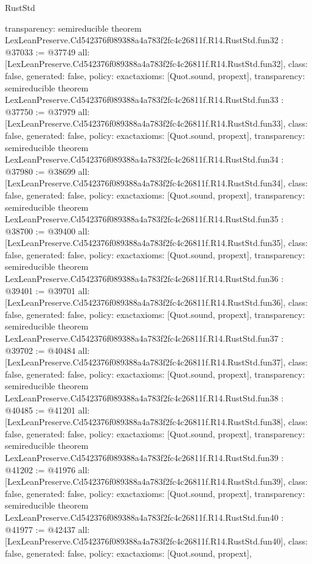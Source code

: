 \begin{lexlean}{RustStd}
\begin{coremodule}
{  transparency: semireducible
}
theorem LexLeanPreserve.Cd542376f089388a4a783f2fc4c26811f.R14.RustStd.fun32 : @37033 := @37749 {
  all: [LexLeanPreserve.Cd542376f089388a4a783f2fc4c26811f.R14.RustStd.fun32],
  class: false,
  generated: false,
  policy: exact{axioms: [Quot.sound, propext]},
  transparency: semireducible
}
theorem LexLeanPreserve.Cd542376f089388a4a783f2fc4c26811f.R14.RustStd.fun33 : @37750 := @37979 {
  all: [LexLeanPreserve.Cd542376f089388a4a783f2fc4c26811f.R14.RustStd.fun33],
  class: false,
  generated: false,
  policy: exact{axioms: [Quot.sound, propext]},
  transparency: semireducible
}
theorem LexLeanPreserve.Cd542376f089388a4a783f2fc4c26811f.R14.RustStd.fun34 : @37980 := @38699 {
  all: [LexLeanPreserve.Cd542376f089388a4a783f2fc4c26811f.R14.RustStd.fun34],
  class: false,
  generated: false,
  policy: exact{axioms: [Quot.sound, propext]},
  transparency: semireducible
}
theorem LexLeanPreserve.Cd542376f089388a4a783f2fc4c26811f.R14.RustStd.fun35 : @38700 := @39400 {
  all: [LexLeanPreserve.Cd542376f089388a4a783f2fc4c26811f.R14.RustStd.fun35],
  class: false,
  generated: false,
  policy: exact{axioms: [Quot.sound, propext]},
  transparency: semireducible
}
theorem LexLeanPreserve.Cd542376f089388a4a783f2fc4c26811f.R14.RustStd.fun36 : @39401 := @39701 {
  all: [LexLeanPreserve.Cd542376f089388a4a783f2fc4c26811f.R14.RustStd.fun36],
  class: false,
  generated: false,
  policy: exact{axioms: [Quot.sound, propext]},
  transparency: semireducible
}
theorem LexLeanPreserve.Cd542376f089388a4a783f2fc4c26811f.R14.RustStd.fun37 : @39702 := @40484 {
  all: [LexLeanPreserve.Cd542376f089388a4a783f2fc4c26811f.R14.RustStd.fun37],
  class: false,
  generated: false,
  policy: exact{axioms: [Quot.sound, propext]},
  transparency: semireducible
}
theorem LexLeanPreserve.Cd542376f089388a4a783f2fc4c26811f.R14.RustStd.fun38 : @40485 := @41201 {
  all: [LexLeanPreserve.Cd542376f089388a4a783f2fc4c26811f.R14.RustStd.fun38],
  class: false,
  generated: false,
  policy: exact{axioms: [Quot.sound, propext]},
  transparency: semireducible
}
theorem LexLeanPreserve.Cd542376f089388a4a783f2fc4c26811f.R14.RustStd.fun39 : @41202 := @41976 {
  all: [LexLeanPreserve.Cd542376f089388a4a783f2fc4c26811f.R14.RustStd.fun39],
  class: false,
  generated: false,
  policy: exact{axioms: [Quot.sound, propext]},
  transparency: semireducible
}
theorem LexLeanPreserve.Cd542376f089388a4a783f2fc4c26811f.R14.RustStd.fun40 : @41977 := @42437 {
  all: [LexLeanPreserve.Cd542376f089388a4a783f2fc4c26811f.R14.RustStd.fun40],
  class: false,
  generated: false,
  policy: exact{axioms: [Quot.sound, propext]},
}
\end{coremodule}
\end{lexlean}
